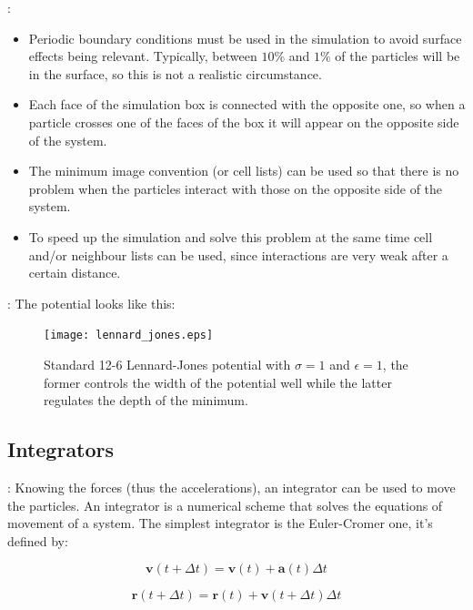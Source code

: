 \documentclass{beamer}
\begin{document}
			\begin{frame}{\secname : \subsecname}
				\begin{itemize}
					\item Periodic boundary conditions must be used in the simulation to avoid surface effects being relevant. Typically, between $10\%$ and $1\%$ of the particles will be in the surface, so this is not a realistic circumstance.
					\item Each face of the simulation box is connected with the opposite one, so when a particle crosses one of the faces of the box it will appear on the opposite side of the system.
					\item The minimum image convention (or cell lists) can be used so that there is no problem when the particles interact with those on the opposite side of the system.
					\item To speed up the simulation and solve this problem at the same time cell and/or neighbour lists can be used, since interactions are very weak after a certain distance.
				\end{itemize}
			\end{frame}
			
			\begin{frame}{\secname : \subsecname}
				The potential looks like this:
				
				\begin{figure}[ht!]\begin{center}\texttt{[image: lennard\_jones.eps]}\par\protect\caption{Standard 12-6 Lennard-Jones potential with $\sigma=1$ and $\epsilon=1$, the former controls the width of the potential well while the latter regulates the depth of the minimum.}\end{center}\end{figure}
			\end{frame}
		
		\subsection{Integrators}
		
			\begin{frame}{\secname : \subsecname}
				Knowing the forces (thus the accelerations), an integrator can be used to move the particles. An integrator is a numerical scheme that solves the equations of movement of a system. The simplest integrator is the Euler-Cromer one, it's defined by:
		
				\begin{equation*}\mathbf{v}\left(t+\Delta t\right)=\mathbf{v}\left(t\right)+\mathbf{a}\left(t\right)\Delta t\end{equation*}
		
				\begin{equation*}\mathbf{r}\left(t+\Delta t\right)=\mathbf{r}\left(t\right)+\mathbf{v}\left(t+\Delta t\right)\Delta t\end{equation*}
			\end{frame}
			
\end{document}
